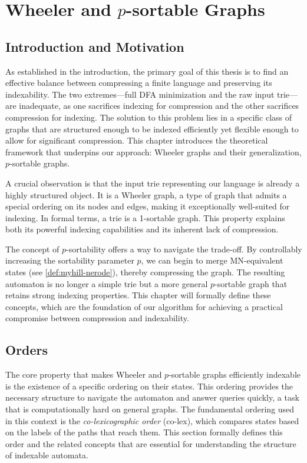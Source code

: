 \section{Wheeler and \texorpdfstring{$p$}{p}-sortable Graphs}
\label{sec:wheeler_and_psortable_graphs}

\subsection{Introduction and Motivation}
As established in the introduction, the primary goal of this thesis is to find an effective balance between compressing a finite language and preserving its indexability. The two extremes—full DFA minimization and the raw input trie—are inadequate, as one sacrifices indexing for compression and the other sacrifices compression for indexing. The solution to this problem lies in a specific class of graphs that are structured enough to be indexed efficiently yet flexible enough to allow for significant compression. This chapter introduces the theoretical framework that underpins our approach: Wheeler graphs and their generalization, $p$-sortable graphs.

A crucial observation is that the input trie representing our language is already a highly structured object. It is a Wheeler graph, a type of graph that admits a special ordering on its nodes and edges, making it exceptionally well-suited for indexing. In formal terms, a trie is a 1-sortable graph. This property explains both its powerful indexing capabilities and its inherent lack of compression.

The concept of $p$-sortability offers a way to navigate the trade-off. By controllably increasing the sortability parameter $p$, we can begin to merge MN-equivalent states (see \cref{def:myhill-nerode}), thereby compressing the graph. The resulting automaton is no longer a simple trie but a more general $p$-sortable graph that retains strong indexing properties. This chapter will formally define these concepts, which are the foundation of our algorithm for achieving a practical compromise between compression and indexability.

\subsection{Orders}
The core property that makes Wheeler and $p$-sortable graphs efficiently indexable is the existence of a specific ordering on their states. This ordering provides the necessary structure to navigate the automaton and answer queries quickly, a task that is computationally hard on general graphs. The fundamental ordering used in this context is the \textit{co-lexicographic order} (co-lex), which compares states based on the labels of the paths that reach them. This section formally defines this order and the related concepts that are essential for understanding the structure of indexable automata.

